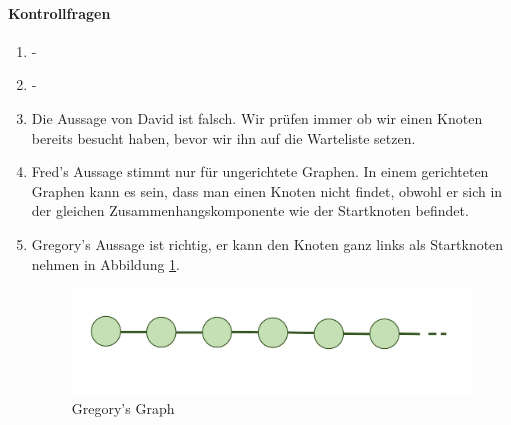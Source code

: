 \paragraph{Kontrollfragen}
\begin{enumerate}
    \item -
    \item - 
    \item Die Aussage von David ist falsch. Wir prüfen immer ob wir einen Knoten bereits besucht haben, bevor wir ihn auf die Warteliste setzen.
    \item Fred's Aussage stimmt nur für ungerichtete Graphen. In einem gerichteten Graphen kann es sein, dass man einen Knoten nicht findet, obwohl er sich in der gleichen Zusammenhangskomponente wie der Startknoten befindet.
    \item Gregory's Aussage ist richtig, er kann den Knoten ganz links als Startknoten nehmen in Abbildung \ref{fig:Gregory}.
    \begin{figure}[H]
        \centering
        \includegraphics[width=\textwidth]{Pictures/Kontrollfragen.PNG}
        \caption{Gregory's Graph}
        \label{fig:Gregory}
    \end{figure}
\end{enumerate}

